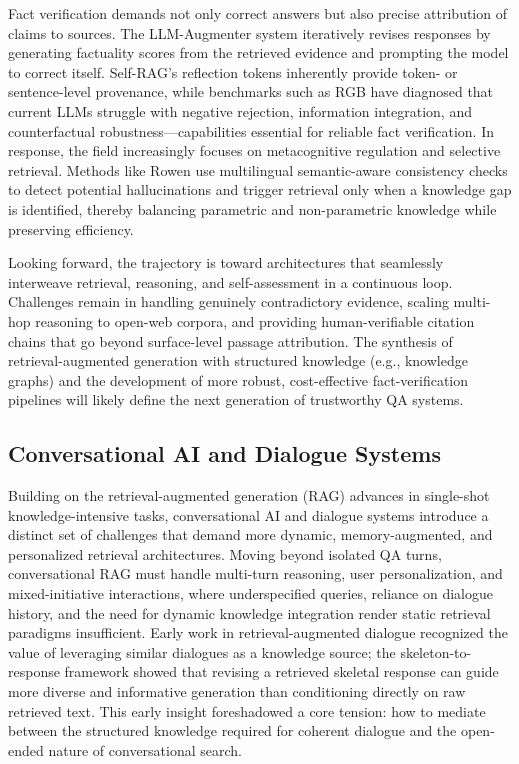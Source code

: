 \documentclass[11pt,a4paper]{article}
\begin{document}
Fact verification demands not only correct answers but also precise attribution of claims to sources. The LLM-Augmenter system \cite{arxiv:2302.12813v3} iteratively revises responses by generating factuality scores from the retrieved evidence and prompting the model to correct itself. Self-RAG's reflection tokens inherently provide token- or sentence-level provenance, while benchmarks such as RGB \cite{arxiv:2309.01431v2} have diagnosed that current LLMs struggle with negative rejection, information integration, and counterfactual robustness---capabilities essential for reliable fact verification. In response, the field increasingly focuses on metacognitive regulation and selective retrieval. Methods like Rowen \cite{arxiv:2402.10612v1} use multilingual semantic-aware consistency checks to detect potential hallucinations and trigger retrieval only when a knowledge gap is identified, thereby balancing parametric and non-parametric knowledge while preserving efficiency.

Looking forward, the trajectory is toward architectures that seamlessly interweave retrieval, reasoning, and self-assessment in a continuous loop. Challenges remain in handling genuinely contradictory evidence, scaling multi-hop reasoning to open-web corpora, and providing human-verifiable citation chains that go beyond surface-level passage attribution. The synthesis of retrieval-augmented generation with structured knowledge (e.g., knowledge graphs) and the development of more robust, cost-effective fact-verification pipelines will likely define the next generation of trustworthy QA systems.


\subsection{Conversational AI and Dialogue Systems}


Building on the retrieval-augmented generation (RAG) advances in single-shot knowledge-intensive tasks, conversational AI and dialogue systems introduce a distinct set of challenges that demand more dynamic, memory-augmented, and personalized retrieval architectures. Moving beyond isolated QA turns, conversational RAG must handle multi-turn reasoning, user personalization, and mixed-initiative interactions, where underspecified queries, reliance on dialogue history, and the need for dynamic knowledge integration render static retrieval paradigms insufficient. Early work in retrieval-augmented dialogue recognized the value of leveraging similar dialogues as a knowledge source; the skeleton-to-response framework \cite{arxiv:1809.05296v5} showed that revising a retrieved skeletal response can guide more diverse and informative generation than conditioning directly on raw retrieved text. This early insight foreshadowed a core tension: how to mediate between the structured knowledge required for coherent dialogue and the open-ended nature of conversational search.
\end{document}
